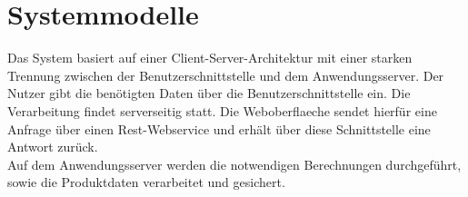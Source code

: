 \section{Systemmodelle}
\begin{figure}[!htb]
	\resizebox{\textwidth}{!} {
		
	}
\end{figure}
Das System basiert auf einer Client-Server-Architektur mit einer starken Trennung zwischen der Benutzerschnittstelle und dem Anwendungsserver. Der Nutzer gibt die benötigten Daten über die Benutzerschnittstelle ein. Die Verarbeitung findet serverseitig statt. Die \gls{Weboberflaeche} sendet hierfür eine Anfrage über einen \gls{Rest}-\gls{Webservice}
 und erhält über diese Schnittstelle eine Antwort zurück. \\
Auf dem Anwendungsserver werden die notwendigen Berechnungen durchgeführt, sowie die Produktdaten verarbeitet und gesichert.
